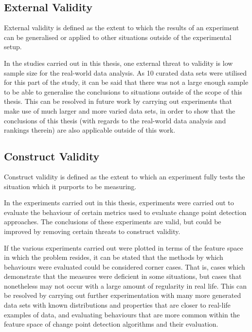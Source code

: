 \documentclass[../main.tex]{subfiles}
\begin{document}
\subsection{External Validity}

External validity is defined as the extent to which the results of an experiment can be generalised or applied to other situations outside of the experimental setup.

In the studies carried out in this thesis, one external threat to validity is low sample size for the real-world data analysis. As 10 curated data sets were utilised for this part of the study, it can be said that there was not a large enough sample to be able to generalise the conclusions to situations outside of the scope of this thesis. This can be resolved in future work by carrying out experiments that make use of much larger and more varied data sets, in order to show that the conclusions of this thesis (with regards to the real-world data analysis and rankings therein) are also applicable outside of this work.

\subsection{Construct Validity}

Construct validity is defined as the extent to which an experiment fully tests the situation which it purports to be measuring.

In the experiments carried out in this thesis, experiments were carried out to evaluate the behaviour of certain metrics used to evaluate change point detection approaches. The conclusions of these experiments are valid, but could be improved by removing certain threats to construct validity.

If the various experiments carried out were plotted in terms of the feature space in which the problem resides, it can be stated that the methods by which behaviours were evaluated could be considered corner cases. That is, cases which demonstrate that the measures were deficient in some situations, but cases that nonetheless may not occur with a large amount of regularity in real life. This can be resolved by carrying out further experimentation with many more generated data sets with known distributions and properties that are closer to real-life examples of data, and evaluating behaviours that are more common within the feature space of change point detection algorithms and their evaluation.
\end{document}
